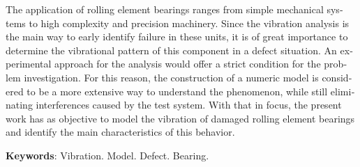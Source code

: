 \begin{resumo}
	\SingleSpacing
	\begin{otherlanguage}{english}
		The application of rolling element bearings ranges from simple mechanical systems to high complexity and precision machinery.
		Since the vibration analysis is the main way to early identify failure in these units, it is of great importance to determine the vibrational pattern of this component in a defect situation.
		An experimental approach for the analysis would offer a strict condition for the problem investigation.
		For this reason, the construction of a numeric model is considered to be a more extensive way to understand the phenomenon, while still eliminating interferences caused by the test system.
		With that in focus, the present work has as objective to model the vibration of damaged rolling element bearings and identify the main characteristics of this behavior.
		\vspace{\onelineskip}
		
		\noindent
		\textbf{Keywords}: Vibration. Model. Defect. Bearing.
	\end{otherlanguage}
\end{resumo}
\listoffigures*
\cleardoublepage


\listoftables*
\cleardoublepage

\listofsiglas*
\cleardoublepage

\listofsimbolos*
\cleardoublepage

\tableofcontents*
\cleardoublepage
